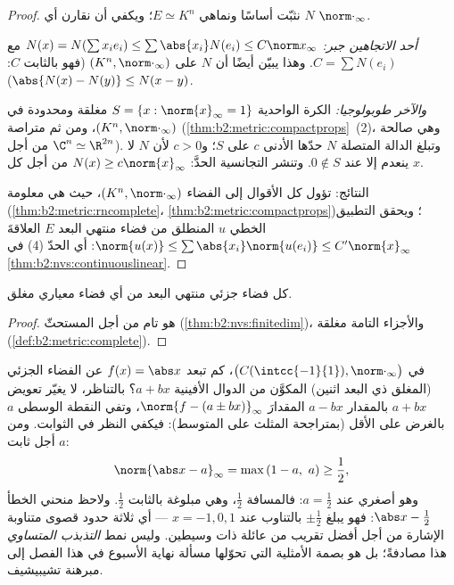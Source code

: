 \begin{proof}
نثبّت أساسًا ونماهي $E \simeq K^n$؛ ويكفي أن نقارن أي
 $N$  $\norm\cdot_\infty$.

\emph{أحد الاتجاهين جبر:} $N(x) = N(\sum x_i e_i) \leq
\sum \abs{x_i} N(e_i) \leq C \norm x_\infty$ مع $C = \sum N(e_i)$.
وهذا يبيّن أيضًا أن $N$  على $(K^n, \norm\cdot_\infty)$
(فهو  بالثابت $C$: $\abs{N(x) - N(y)} \leq N(x - y)$).

\emph{والآخر طوبولوجيا:} الكرة الواحدية $S = \{x :
\norm{x}_\infty = 1\}$ مغلقة ومحدودة في $(K^n,
\norm\cdot_\infty)$، ومن ثم متراصة
(\cref{thm:b2:metric:compactprops}~(2)، وهي صالحة من أجل $\C^n \simeq
\R^{2n}$). وتبلغ الدالة المتصلة $N$ حدّها الأدنى $c$ على
$S$؛ و$c > 0$ لأن $N$ لا ينعدم إلا عند $0 \notin S$. وتنشر التجانسية
الحدَّ: $N(x) \geq c \norm{x}_\infty$ من أجل كل $x$.

النتائج: تؤول كل الأقوال إلى الفضاء $(K^n,
\norm\cdot_\infty)$، حيث هي معلومة
(\cref{thm:b2:metric:rncomplete}،
\cref{thm:b2:metric:compactprops})؛ ويحقق التطبيق الخطي $u$ المنطلق من
فضاء منتهي البعد $E$ العلاقةَ $\norm{u(x)} \leq \sum\abs{x_i}
\norm{u(e_i)} \leq C'\norm{x}_\infty$: أي الحدّ (4) في
\cref{thm:b2:nvs:continuouslinear}.
\end{proof}

\begin{corollary}\label{cor:b2:nvs:closedsubspace}
كل فضاء جزئي منتهي البعد من أي فضاء معياري مغلق.
\end{corollary}

\begin{proof}
هو تام من أجل  المستحثّ
(\cref{thm:b2:nvs:finitedim})، والأجزاء التامة مغلقة
(\cref{def:b2:metric:complete}).
\end{proof}

\begin{example}\label{ex:b2:nvs:bestaffine}
في $\bigl(C(\intcc{-1}{1}), \norm\cdot_\infty\bigr)$، كم تبعد
$f(x) = \abs x$ عن الفضاء الجزئي (المغلق ذي البعد اثنين) المكوَّن
من الدوال الأفينية $a + bx$؟ بالتناظر، لا يغيّر تعويض $a + bx$ بالمقدار
$a - bx$ المقدارَ $\norm{f - (a \pm bx)}_\infty$، وتفي النقطة
الوسطى $a$ بالغرض على الأقل (بمتراجحة المثلث على
المتوسط): فيكفي النظر في الثوابت. ومن أجل ثابت
$a$:
\[
\norm{\abs x - a}_\infty = \max\,(1 - a,\ a)
\geq \frac12 ,
\]
وهو أصغري عند $a = \frac12$: فالمسافة $\frac12$، وهي مبلوغة
بالثابت $\frac12$. ولاحظ منحني الخطأ $\abs x -
\frac12$: فهو يبلغ $\pm\frac12$ بالتناوب عند $x = -1, 0,
1$ --- أي ثلاثة حدود قصوى متناوبة الإشارة من أجل أفضل
تقريب من عائلة ذات وسيطين. وليس نمط
\emph{التذبذب المتساوي} هذا مصادفةً؛ بل هو
بصمة الأمثلية التي تحوّلها مسألة نهاية الأسبوع في هذا الفصل
إلى مبرهنة تشيبيشيف.
\end{example}

